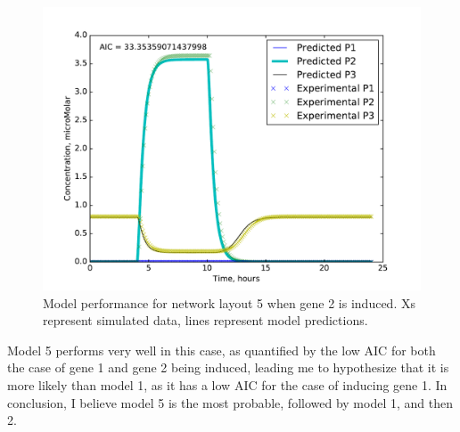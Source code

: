 \documentclass{article}
\begin{document}
\begin{figure}[!htb]
\includegraphics[width=12cm]{../Problem3/figures/postNMPlotLayout5Gene2}
\caption{Model performance for network layout 5 when gene 2 is induced. Xs represent simulated data, lines represent model predictions.}
\label{fig:P3Layout5Induce2}
\end{figure}

Model 5 performs very well in this case, as quantified by the low AIC for both the case of gene 1 and gene 2 being induced, leading me to hypothesize that it is more likely than model 1, as it has a low AIC for the case of inducing gene 1. In conclusion, I believe model 5 is the most probable, followed by model 1, and then 2.
\end{document}
